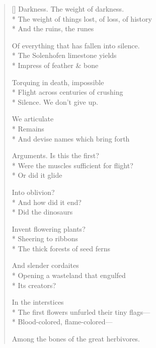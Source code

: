 \label{ch:mythological_bird}
\settowidth{\versewidth}{The first flowers unfurled their tiny flags---}
\begin{verse}[\versewidth]
Darkness. The weight of darkness.\\*
The weight of things lost, of loss, of history\\*
And the ruins, the runes

Of everything   that has fallen into silence.\\*
The Solenhofen limestone yields\\*
Impress of feather \& bone

Torquing in death, impossible\\*
Flight across centuries of crushing\\*
Silence.      We don't give up.

We articulate\\*
Remains\\*
And devise names which bring forth

Arguments.   Is this the first?\\*
Were the muscles sufficient for flight?\\*
Or did it glide

Into oblivion?\\*
And how did it end?\\*
Did the dinosaurs 

Invent flowering plants?\\*
Sheering to ribbons\\*
The thick forests of seed ferns

And slender cordaites\\*
Opening a wasteland that engulfed\\*
Its creators?

In the interstices\\*
The first flowers unfurled their tiny flags---\\*
Blood-colored, flame-colored---

Among the bones of the great herbivores.
\end{verse}

